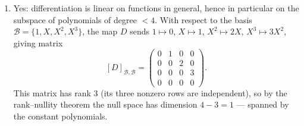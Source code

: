 \begin{exercisesolution}
\begin{enumerate}[label=\textbf{\arabic*.}]
    zero, the parallelogram collapses to a line segment; if $\phi \equiv 0$, it collapses to the
    single point $\{0\}$.
  \item Yes: differentiation is linear on functions in general, hence in particular on the
    subspace of polynomials of degree $< 4$. With respect to the basis
    $\mathcal{B} = \{1, X, X^2, X^3\}$, the map $D$ sends $1 \mapsto 0$, $X \mapsto 1$,
    $X^2 \mapsto 2X$, $X^3 \mapsto 3X^2$, giving matrix
    \[
      [D]_{\mathcal{B},\mathcal{B}} =
      \begin{pmatrix} 0&1&0&0 \\ 0&0&2&0 \\ 0&0&0&3 \\ 0&0&0&0 \end{pmatrix}.
    \]
    This matrix has rank $3$ (its three nonzero rows are independent), so by the rank--nullity
    theorem the null space has dimension $4 - 3 = 1$ --- spanned by the constant polynomials.
\end{enumerate}
\end{exercisesolution}

